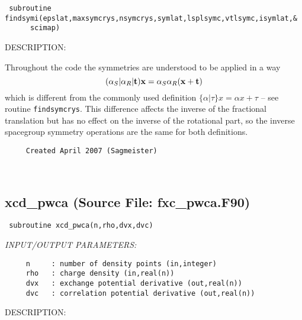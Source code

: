 \documentclass[11pt]{article}
\begin{document}
\begin{verbatim} subroutine findsymi(epslat,maxsymcrys,nsymcrys,symlat,lsplsymc,vtlsymc,isymlat,&
      scimap)\end{verbatim}
{\sf DESCRIPTION:\\ }


     Throughout the code the symmetries are understood to be applied in a way 
     $$ (\alpha_S|\alpha_R|{\bf t}) {\bf x} = \alpha_S\alpha_R
     ({\bf x}+{\bf t})$$
     which is different from the commonly used definition
     $\{\alpha|\tau\}x=\alpha x+\tau$ -- see routine {\tt findsymcrys}.
     This difference affects the inverse of the fractional translation
     but has no effect on the inverse of the rotational part, so the inverse
     spacegroup symmetry operations are the same for both definitions.
  
\begin{verbatim}     Created April 2007 (Sagmeister)\end{verbatim}












 
 
\mbox{}\hrulefill\ 
 
\subsection{xcd\_pwca (Source File: fxc\_pwca.F90)}


\begin{verbatim} subroutine xcd_pwca(n,rho,dvx,dvc)\end{verbatim}{\em INPUT/OUTPUT PARAMETERS:}
\begin{verbatim}     n     : number of density points (in,integer)
     rho   : charge density (in,real(n))
     dvx   : exchange potential derivative (out,real(n))
     dvc   : correlation potential derivative (out,real(n))\end{verbatim}
{\sf DESCRIPTION:\\ }
\end{document}
